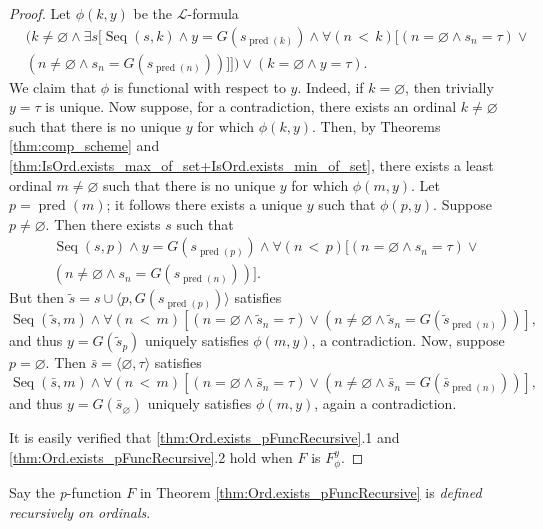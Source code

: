 \begin{proof}
    Let $\phi(k,y)$ be the $\mathcal{L}$-formula
    \begin{equation*}
        \begin{split}
    & (k \neq \varnothing \land \exists s [\operatorname{Seq}(s,k) \land 
    y = G(s_{\operatorname{pred}(k)}) \land \forall (n\,<\,k)[(n=\varnothing \land s_n = \tau)
    \lor\\ &(n \neq \varnothing \land s_n = G(s_{\operatorname{pred}(n)}))]])
    \lor (k = \varnothing \land y = \tau).
        \end{split}
    \end{equation*}
    We claim that $\phi$ is functional with respect to $y$.
    Indeed, if $k=\varnothing$, then trivially $y=\tau$ is unique.
    Now suppose, for a contradiction, there exists an ordinal $k\neq \varnothing$ such that there
    is no unique $y$ for which $\phi(k,y)$. 
    Then, by Theorems \ref{thm:comp_scheme} and 
    \ref{thm:IsOrd.exists_max_of_set+IsOrd.exists_min_of_set}, there exists a
    least ordinal $m\neq\varnothing$ such that there is no unique $y$ for which $\phi(m,y)$.
    Let $p=\operatorname{pred}(m)$; it follows there exists a unique $y$ such that $\phi(p,y)$.
    Suppose $p\neq \varnothing$. Then there exists $s$ such that
    \begin{equation*}
        \begin{split}
    &\operatorname{Seq}(s,p) \land y = G(s_{\operatorname{pred}(p)}) \land 
    \forall (n\,<\,p)[(n=\varnothing \land s_n = \tau) \lor \\& 
    (n \neq \varnothing \land s_n = G(s_{\operatorname{pred}(n)}))].
        \end{split}
    \end{equation*}
    But then $\tilde{s} = s \cup \langle p, G(s_{\operatorname{pred}(p)}) \rangle$ satisfies
    \begin{equation*}
    \operatorname{Seq}(\tilde{s},m) \land \forall (n\,<\,m)[(n=\varnothing \land \tilde{s}_n = \tau) 
    \lor (n \neq \varnothing \land \tilde{s}_n = G(\tilde{s}_{\operatorname{pred}(n)}))], 
    \end{equation*}
    and thus $y = G(\tilde{s}_p)$ uniquely satisfies $\phi(m,y)$, a contradiction.
    Now, suppose $p=\varnothing$. Then $\bar{s}=\langle \varnothing, \tau \rangle$ satisfies
    \begin{equation*}
        \operatorname{Seq}(\bar{s},m) \land \forall (n\,<\,m)[(n=\varnothing \land \bar{s}_n = \tau) 
        \lor (n \neq \varnothing \land \bar{s}_n = G(\bar{s}_{\operatorname{pred}(n)}))], 
    \end{equation*}
    and thus $y = G(\bar{s}_\varnothing)$ uniquely satisfies $\phi(m,y)$, again a contradiction.
    
    It is easily verified that \ref{thm:Ord.exists_pFuncRecursive}.1 and 
    \ref{thm:Ord.exists_pFuncRecursive}.2 hold when $F$ is $F_\phi^y$.
\end{proof}

\begin{definition}
    \label{def:Ord.pFuncRecursive}
    Say the \textit{p}-function $F$ in Theorem \ref{thm:Ord.exists_pFuncRecursive} is
    \textit{defined recursively on ordinals}.
\end{definition}

